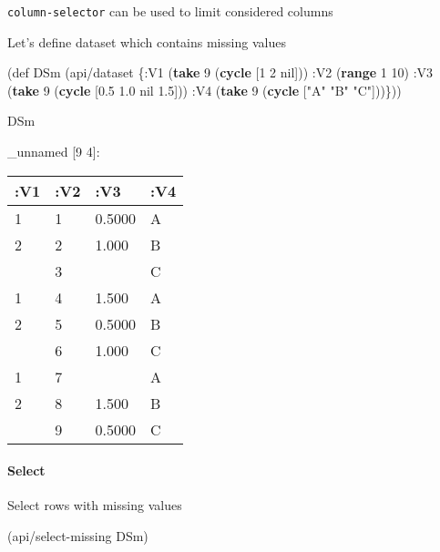 \documentclass[]{article}
\newenvironment{Shaded}{\begin{snugshade}}{\end{snugshade}}
\newcommand{\KeywordTok}[1]{\textcolor[rgb]{0.13,0.29,0.53}{\textbf{#1}}}
\newcommand{\DecValTok}[1]{\textcolor[rgb]{0.00,0.00,0.81}{#1}}
\newcommand{\FloatTok}[1]{\textcolor[rgb]{0.00,0.00,0.81}{#1}}
\newcommand{\StringTok}[1]{\textcolor[rgb]{0.31,0.60,0.02}{#1}}
\newcommand{\FunctionTok}[1]{\textcolor[rgb]{0.00,0.00,0.00}{#1}}
\newcommand{\VariableTok}[1]{\textcolor[rgb]{0.00,0.00,0.00}{#1}}
\newcommand{\BuiltInTok}[1]{#1}
\newcommand{\AttributeTok}[1]{\textcolor[rgb]{0.77,0.63,0.00}{#1}}
\newcommand{\NormalTok}[1]{#1}
\let\oldparagraph\paragraph
\renewcommand{\paragraph}[1]{\oldparagraph{#1}\mbox{}}
\begin{document}
\texttt{column-selector} can be used to limit considered columns

Let's define dataset which contains missing values

\begin{Shaded}
\begin{Highlighting}[]
\NormalTok{(}\BuiltInTok{def}\FunctionTok{ DSm }\NormalTok{(api/dataset \{}\AttributeTok{:V1}\NormalTok{ (}\KeywordTok{take} \DecValTok{9}\NormalTok{ (}\KeywordTok{cycle}\NormalTok{ [}\DecValTok{1} \DecValTok{2} \VariableTok{nil}\NormalTok{]))}
                       \AttributeTok{:V2}\NormalTok{ (}\KeywordTok{range} \DecValTok{1} \DecValTok{10}\NormalTok{)}
                       \AttributeTok{:V3}\NormalTok{ (}\KeywordTok{take} \DecValTok{9}\NormalTok{ (}\KeywordTok{cycle}\NormalTok{ [}\FloatTok{0.5} \FloatTok{1.0} \VariableTok{nil} \FloatTok{1.5}\NormalTok{]))}
                       \AttributeTok{:V4}\NormalTok{ (}\KeywordTok{take} \DecValTok{9}\NormalTok{ (}\KeywordTok{cycle}\NormalTok{ [}\StringTok{"A"} \StringTok{"B"} \StringTok{"C"}\NormalTok{]))\}))}
\end{Highlighting}
\end{Shaded}

\begin{Shaded}
\begin{Highlighting}[]
\NormalTok{DSm}
\end{Highlighting}
\end{Shaded}

\_unnamed {[}9 4{]}:

\begin{longtable}[]{@{}llll@{}}
\toprule
:V1 & :V2 & :V3 & :V4\tabularnewline
\midrule
\endhead
1 & 1 & 0.5000 & A\tabularnewline
2 & 2 & 1.000 & B\tabularnewline
& 3 & & C\tabularnewline
1 & 4 & 1.500 & A\tabularnewline
2 & 5 & 0.5000 & B\tabularnewline
& 6 & 1.000 & C\tabularnewline
1 & 7 & & A\tabularnewline
2 & 8 & 1.500 & B\tabularnewline
& 9 & 0.5000 & C\tabularnewline
\bottomrule
\end{longtable}

\paragraph{Select}\label{select-2}

Select rows with missing values

\begin{Shaded}
\begin{Highlighting}[]
\NormalTok{(api/select-missing DSm)}
\end{Highlighting}
\end{Shaded}
\end{document}
